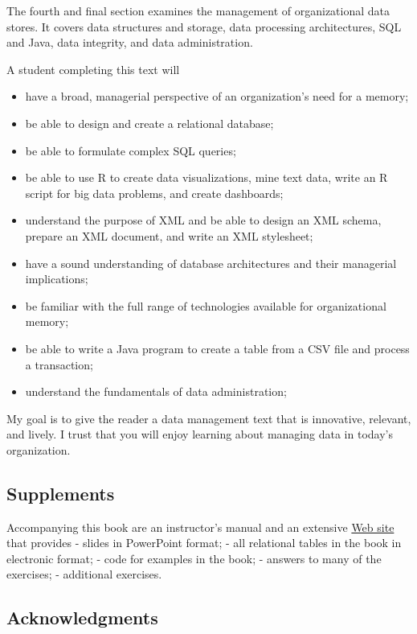 \documentclass[
]{article}
\begin{document}
The fourth and final section examines the management of organizational
data stores. It covers data structures and storage, data processing
architectures, SQL and Java, data integrity, and data administration.

A student completing this text will

\begin{itemize}
\item
  have a broad, managerial perspective of an organization's need for a
  memory;
\item
  be able to design and create a relational database;
\item
  be able to formulate complex SQL queries;
\item
  be able to use R to create data visualizations, mine text data,
  write an R script for big data problems, and create dashboards;
\item
  understand the purpose of XML and be able to design an XML schema,
  prepare an XML document, and write an XML stylesheet;
\item
  have a sound understanding of database architectures and their
  managerial implications;
\item
  be familiar with the full range of technologies available for
  organizational memory;
\item
  be able to write a Java program to create a table from a CSV file
  and process a transaction;
\item
  understand the fundamentals of data administration;
\end{itemize}

My goal is to give the reader a data management text that is innovative,
relevant, and lively. I trust that you will enjoy learning about
managing data in today's organization.

\hypertarget{supplements}{%
\subsection*{Supplements}\label{supplements}}

Accompanying this book are an instructor's manual and an extensive \href{https://www.richardtwatson.com/dm6e/}{Web
site} that provides
- slides in PowerPoint format;
- all relational tables in the book in electronic format;
- code for examples in the book;
- answers to many of the exercises;
- additional exercises.

\hypertarget{acknowledgments}{%
\subsection*{Acknowledgments}\label{acknowledgments}}
\end{document}

